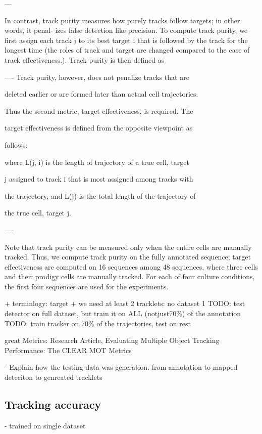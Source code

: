 	---
	
	In contrast, track purity measures how purely tracks follow targets; in other words, it penal-
	izes false detection like precision. To compute track purity, we first assign each track j to its best
	target i that is followed by the track for the longest time (the roles of track and target are changed
	compared to the case of track effectiveness.). Track purity is then defined as
	
	----
	Track purity, however, does not penalize tracks that are

	deleted earlier or are formed later than actual cell trajectories.

	Thus the second metric, target effectiveness, is required. The

	target effectiveness is defined from the opposite viewpoint as

	follows:


	where L(j, i) is the length of trajectory of a true cell, target

	j assigned to track i that is most assigned among tracks with

	the trajectory, and L(j) is the total length of the trajectory of

	the true cell, target j.
	
	----
	
	
	Note that track purity can be measured only when the entire cells are manually tracked. Thus,
	we compute track purity on the fully annotated sequence; target effectiveness are computed on 16
	sequences among 48 sequences, where three cells and their prodigy cells are manually tracked.
	For each of four culture conditions, the first four sequences are used for the experiments.
	
	
	
	
		+ terminlogy: target
		+ we need at least 2 tracklets: no dataset 1
	TODO: test detector on full dataset, but train it on ALL (notjust70\%) of the annotation
	TODO: train tracker on 70\% of the trajectories, test on rest
	
	great Metrics: Research Article, Evaluating Multiple Object Tracking Performance: The CLEAR MOT Metrics
	
	- Explain how the testing data was generation. from annotation to mapped deteciton to genreated tracklets

	\subsection{Tracking accuracy \statusnew}
		- trained on single dataset
		
